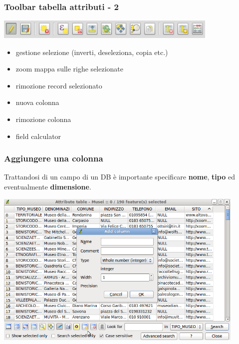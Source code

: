 \documentclass{beamer}
\begin{document}
{\begin{frame}
     \frametitle{Toolbar tabella attributi - 2}
	 \begin{center}
	 \includegraphics[width=0.8\textwidth] {topology_attrmanagement_pics/tool_bar.png}
	  \end{center}
	\begin{itemize}
		 \item gestione selezione (inverti, deseleziona, copia etc.)
		 \item zoom mappa sulle righe selezionate
		 \item rimozione record selezionato
		 \item nuova colonna
		 \item rimozione colonna
		 \item field calculator
	\end{itemize}	 
 \end{frame}


 \begin{frame}
   \frametitle{Aggiungere una colonna}
  Trattandosi di un campo di un DB è importante specificare  \textbf{nome}, \textbf{tipo} ed eventualmente \textbf{dimensione}. 
		    \begin{center}
			\includegraphics[width=0.90\textwidth] {topology_attrmanagement_pics/add_column.png}
		    \end{center}
\end{frame}


}
\end{document}
